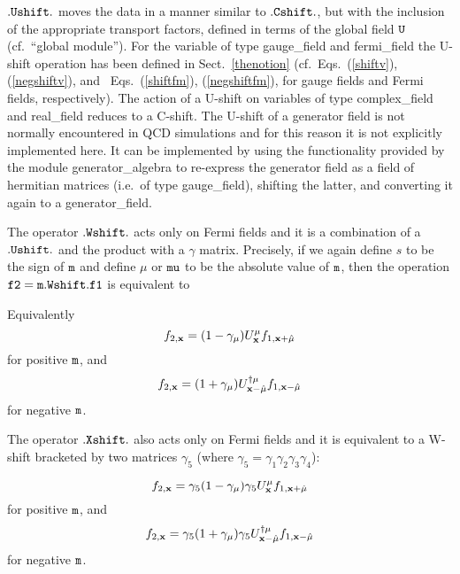 $\tt .Ushift.$ moves the data in a manner similar to $\tt .Cshift.$,
but with the inclusion of the appropriate transport factors, defined
in terms of the global field $\tt U$ (cf.~``global module''). 
For the variable of type gauge\_field and fermi\_field the U-shift
operation has been defined in Sect.~\ref{thenotion} (cf.~Eqs.~(\ref{shiftv}),
(\ref{negshiftv}), and ~Eqs.~(\ref{shiftfm}), (\ref{negshiftfm}),
for gauge fields and Fermi fields, respectively).  
The action of a U-shift on variables
of type complex\_field and real\_field reduces to a C-shift.
The U-shift of a generator field is not normally encountered in
QCD simulations and for this reason it is not explicitly implemented here.
It can be implemented by using the functionality provided by the
module generator\_algebra to re-express the generator field as a field
of hermitian matrices (i.e.~of type gauge\_field), shifting the latter,
and converting it again to a generator\_field.

The operator $\tt .Wshift.$ acts only on Fermi fields and it is a 
combination of a $\tt .Ushift.$ and the product with a $\gamma$
matrix.  Precisely, if we again define $s$ to be the sign of $\tt m$
and define $\mu$ or $\tt mu$ to be the absolute value of $\tt m$,
then the operation $\tt f2=m.Wshift.f1$ is equivalent to
 

Equivalently
%
\begin{equation}
f_{2,{\bf x}}= (1-\gamma_{\mu})U^{\mu}_{{\bf x}} 
f_{1,{\bf x}+\hat\mu}
\label{pwilson}
\end{equation}
%
for positive $\tt m$, and
%
\begin{equation}
f_{2,{\bf x}}= (1+\gamma_{\mu})
U^{\dagger \mu}_{{\bf x}-\hat\mu} f_{1,{\bf x}-\hat\mu}
\label{mwilson}
\end{equation}
%
for negative $\tt m$.

The operator $\tt .Xshift.$ also acts only on Fermi fields and it is 
equivalent to a W-shift bracketed by two matrices $\gamma_5$
(where $\gamma_5=\gamma_1 \gamma_2 \gamma_3 \gamma_4$):

%
\begin{equation}
f_{2,{\bf x}}= \gamma_5 (1-\gamma_{\mu}) \gamma_5 U^{\mu}_{{\bf x}} 
f_{1,{\bf x}+\hat\mu}
\label{pxwilson}
\end{equation}
%
for positive $\tt m$, and
%
\begin{equation}
f_{2,{\bf x}}= \gamma_5 (1+\gamma_{\mu}) \gamma_5
U^{\dagger \mu}_{{\bf x}-\hat\mu} f_{1,{\bf x}-\hat\mu}
\label{mxwilson}
\end{equation}
%
for negative $\tt m$.

